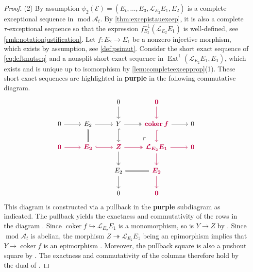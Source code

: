 \documentclass[10pt,twoside, a4paper,reqno]{amsart}
\DeclareMathOperator{\mods}{mod}
\DeclareMathOperator{\Ext}{Ext}
\DeclareMathOperator{\coker}{coker}
\newcommand{\A}{\mathscr{A}}
\newcommand{\Ecal}{\mathcal{E}}
\newcommand{\Lcal}{\mathcal{L}}
\theoremstyle{definition}
\begin{document}
\begin{proof}
    (2) By assumption  $\psi_{2}(\Ecal) = (E_t, \dots, E_3, \Lcal_{E_2} E_1, E_2)$ is a complete exceptional sequence in $\mods \A_t$. By \cref{thm:excepistauexcep}, it is also a complete $\tau$-exceptional sequence so that the expression $f_{E_2}^{-1}(\Lcal_{E_2} E_1)$ is well-defined, see \cref{rmk:notationjustification}. Let $f: E_2 \to E_1$ be a nonzero injective morphism, which exists by assumption, see \cref{def:psimut}. Consider the short exact sequence of \cref{eq:leftmutseq} and a nonsplit short exact sequence in $\Ext^1(\Lcal_{E_2} E_1, E_1)$, which exists and is unique up to isomorphism by \cref{lem:completeexcepprop}(1).  These short exact sequences are highlighted in {\color{purple}\textbf{purple}} in the following commutative diagram.
    \[
    \begin{tikzcd}
        &&0 \arrow[d] & {\color{purple}\boldsymbol{0}} \arrow[d, purple] \\
        0 \arrow[r] & E_2 \arrow[d, equal] \arrow[r] & Y \arrow[r, twoheadrightarrow] \arrow[d, hookrightarrow] \arrow[rd, phantom, "\ulcorner", very near end] & {\color{purple}\boldsymbol{\coker f}} \arrow[d, hookrightarrow, purple] \arrow[r] & 0\\
        {\color{purple}\boldsymbol{0}} \arrow[r, purple] & {\color{purple}\boldsymbol{E_2}} \arrow[r, hookrightarrow, purple] & {\color{purple}\boldsymbol{Z}} \arrow[r, twoheadrightarrow, purple] \arrow[d, twoheadrightarrow] & {\color{purple}\boldsymbol{\Lcal_{E_2} E_1}} \arrow[r, purple] \arrow[d, twoheadrightarrow, purple] & {\color{purple}\boldsymbol{0}} \\
        &&E_2 \arrow[r, equal] \arrow[d] &{\color{purple}\boldsymbol{E_2}} \arrow[d, purple] \\
        &&0 &{\color{purple}\boldsymbol{0}}
    \end{tikzcd}
    \]
    This diagram is constructed via a pullback in the {\color{purple}\textbf{purple}} subdiagram as indicated. The pullback yields the exactness and commutativity of the rows in the diagram \cite[Prop. I.13.1]{Mitchell}. Since $\coker f \hookrightarrow \Lcal_{E_2} E_1$ is a monomorphism, so is  $Y \to Z$ by \cite[Prop. I.7.1]{Mitchell}. Since $\mods \A_t$ is abelian, the morphism $Z \twoheadrightarrow \Lcal_{E_2} E_1$ being an epimorphism implies that $Y \to \coker f$ is an epimorphism \cite[Prop. I.20.2]{Mitchell}. Moreover, the pullback square is also a pushout square by \cite[p. 39, Ex. I.17]{Mitchell}. The exactness and commutativity of the columns therefore hold by the dual of \cite[Prop. I.7.1]{Mitchell}.
    

\end{proof}
\end{document}
